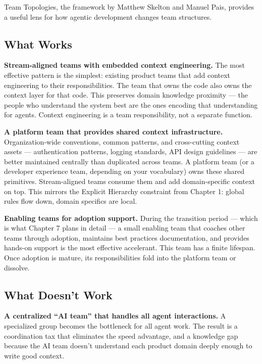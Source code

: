 \documentclass[
  a4paper,
  DIV=11,
  numbers=noendperiod]{scrreprt}
\begin{document}
Team Topologies, the framework by Matthew Skelton and Manuel Pais,
provides a useful lens for how agentic development changes team
structures.

\subsection{What Works}\label{what-works}

\textbf{Stream-aligned teams with embedded context engineering.} The
most effective pattern is the simplest: existing product teams that add
context engineering to their responsibilities. The team that owns the
code also owns the context layer for that code. This preserves domain
knowledge proximity --- the people who understand the system best are
the ones encoding that understanding for agents. Context engineering is
a team responsibility, not a separate function.

\textbf{A platform team that provides shared context infrastructure.}
Organization-wide conventions, common patterns, and cross-cutting
context assets --- authentication patterns, logging standards, API
design guidelines --- are better maintained centrally than duplicated
across teams. A platform team (or a developer experience team, depending
on your vocabulary) owns these shared primitives. Stream-aligned teams
consume them and add domain-specific context on top. This mirrors the
Explicit Hierarchy constraint from Chapter 1: global rules flow down,
domain specifics are local.

\textbf{Enabling teams for adoption support.} During the transition
period --- which is what Chapter 7 plans in detail --- a small enabling
team that coaches other teams through adoption, maintains best practices
documentation, and provides hands-on support is the most effective
accelerant. This team has a finite lifespan. Once adoption is mature,
its responsibilities fold into the platform team or dissolve.

\subsection{What Doesn't Work}\label{what-doesnt-work}

\textbf{A centralized ``AI team'' that handles all agent interactions.}
A specialized group becomes the bottleneck for all agent work. The
result is a coordination tax that eliminates the speed advantage, and a
knowledge gap because the AI team doesn't understand each product domain
deeply enough to write good context.
\end{document}

